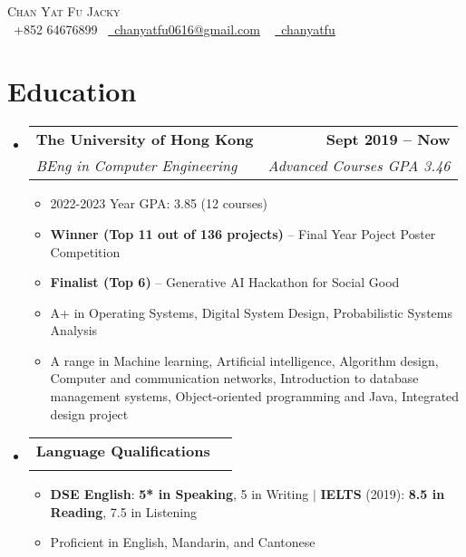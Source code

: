 \documentclass[a4paper,11pt]{article}
\makeatletter
\newcommand{\resumeItem}[1]{
  \item\small{
    {#1 \vspace{-2pt}}
  }
}
\newcommand{\resumeSubheading}[4]{
  \vspace{-2pt}\item
  \begin{tabular*}{1.0\textwidth}[t]{l@{\extracolsep{\fill}}r}
    \textbf{#1} & \textbf{\small #2} \\
    \textit{\small#3} & \textit{\small #4} \\
  \end{tabular*}\vspace{-7pt}
}
\newcommand{\resumeSubHeadingListStart}{\begin{itemize}[leftmargin=0.0in, label={}]}
\newcommand{\resumeSubHeadingListEnd}{\end{itemize}}
\newcommand{\resumeItemListStart}{\begin{itemize}}
\newcommand{\resumeItemListEnd}{\end{itemize}\vspace{-5pt}}
\makeatother
\begin{document}
\begin{center}
  {\Huge \scshape Chan Yat Fu Jacky} \\ \vspace{5pt}
  \small \raisebox{-0.1\height}\faPhone\ +852 64676899~ \href{mailto:chanyatfu0616@gmail.com}{\raisebox{-0.2\height}\faEnvelope\  \underline{chanyatfu0616@gmail.com}} ~
  \href{https://github.com/chanyatfu}{\raisebox{-0.2\height}\faGithub\ \underline{chanyatfu}}
  \vspace{-8pt}
\end{center}

\vspace{-16pt}
\section{Education}
\resumeSubHeadingListStart

\resumeSubheading
{The University of Hong Kong}{Sept 2019 -- Now}{BEng in Computer Engineering}{Advanced Courses GPA 3.46}
\resumeItemListStart
\resumeItem{2022-2023 Year GPA: 3.85 (12 courses)}
\resumeItem{\textbf{Winner (Top 11 out of 136 projects)} -- Final Year Poject Poster Competition}
\resumeItem{\textbf{Finalist (Top 6)} -- Generative AI Hackathon for Social Good}
\resumeItem{A+ in Operating Systems, Digital System Design, Probabilistic Systems Analysis}
\resumeItem{A range in Machine learning, Artificial intelligence, Algorithm design, Computer and communication networks, Introduction to database management systems, Object-oriented programming and Java, Integrated design project}
\resumeItemListEnd

\vspace*{-4pt}

\resumeSubheading{Language Qualifications}{}{}{}\vspace*{-18pt}
\resumeItemListStart
\resumeItem{\textbf{DSE English}: \textbf{5* in Speaking}, 5 in Writing $|$ \textbf{IELTS} (2019): \textbf{8.5 in Reading}, 7.5 in Listening}
\resumeItem{Proficient in English, Mandarin, and Cantonese}
\resumeItemListEnd

\resumeSubHeadingListEnd
\vspace{-16pt}
\end{document}
